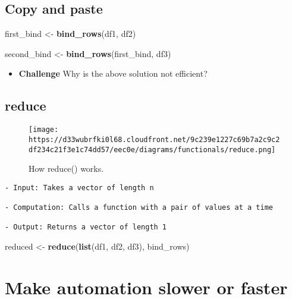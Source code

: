 \documentclass[
]{book}
\newenvironment{Shaded}{\begin{snugshade}}{\end{snugshade}}
\newcommand{\KeywordTok}[1]{\textcolor[rgb]{0.13,0.29,0.53}{\textbf{#1}}}
\newcommand{\NormalTok}[1]{#1}
\newcommand{\StringTok}[1]{\textcolor[rgb]{0.31,0.60,0.02}{#1}}
\providecommand{\tightlist}{%
  \setlength{\itemsep}{0pt}\setlength{\parskip}{0pt}}
\begin{document}
\hypertarget{copy-and-paste}{%
\subsection{Copy and paste}\label{copy-and-paste}}

\begin{Shaded}
\begin{Highlighting}[]
\NormalTok{first\_bind \textless{}{-}}\StringTok{ }\KeywordTok{bind\_rows}\NormalTok{(df1, df2)}

\NormalTok{second\_bind \textless{}{-}}\StringTok{ }\KeywordTok{bind\_rows}\NormalTok{(first\_bind, df3)}
\end{Highlighting}
\end{Shaded}

\begin{itemize}
\tightlist
\item
  \textbf{Challenge}
  Why is the above solution not efficient?
\end{itemize}

\hypertarget{reduce-1}{%
\subsection{reduce}\label{reduce-1}}

\begin{figure}
\centering
\texttt{[image: https://d33wubrfki0l68.cloudfront.net/9c239e1227c69b7a2c9c2df234c21f3e1c74dd57/eec0e/diagrams/functionals/reduce.png]}
\caption{How reduce() works.}
\end{figure}

\begin{verbatim}
- Input: Takes a vector of length n

- Computation: Calls a function with a pair of values at a time

- Output: Returns a vector of length 1
\end{verbatim}

\begin{Shaded}
\begin{Highlighting}[]
\NormalTok{reduced \textless{}{-}}\StringTok{ }\KeywordTok{reduce}\NormalTok{(}\KeywordTok{list}\NormalTok{(df1, df2, df3), bind\_rows)}
\end{Highlighting}
\end{Shaded}

\hypertarget{speed}{%
\section{Make automation slower or faster}\label{speed}}
\end{document}
